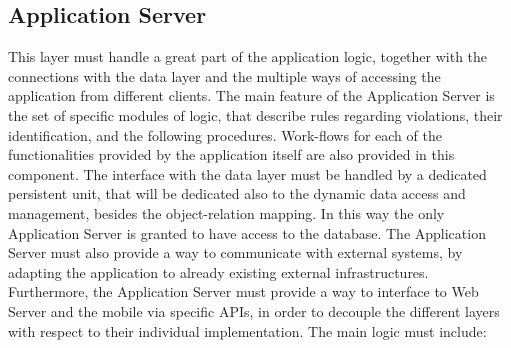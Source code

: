\subsection{Application Server}
This layer must handle a great part of the application logic, together with the connections with the data layer and the 
multiple ways of accessing the application from different clients. The main feature of the Application Server is the set 
of specific modules of logic, that describe rules regarding violations, their identification, and the following procedures. 
Work-flows for each of the functionalities provided by the application itself are also provided in this component. 
\newline The interface with the data layer must be handled by a dedicated persistent unit, that will be dedicated also to 
the dynamic data access and management, besides the object-relation mapping. In this way the only Application Server is 
granted to have access to the database.
\newline The Application Server must also provide a way to communicate with external systems, by adapting the application 
to already existing external infrastructures. Furthermore, the Application Server must provide a way to interface to Web 
Server and the mobile via specific APIs, in order to decouple the different layers with respect to their individual 
implementation.
\newline The main logic must include:
